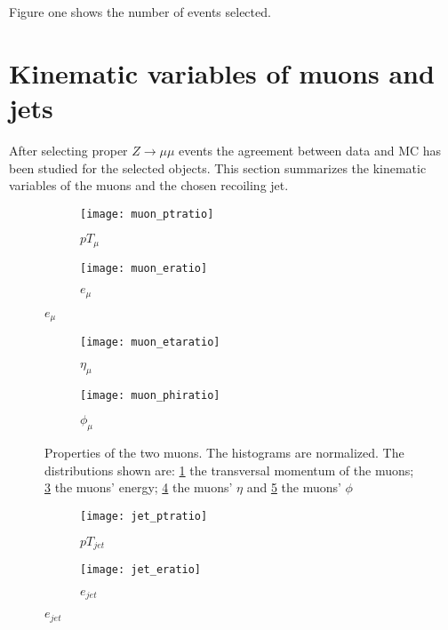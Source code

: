 Figure one shows the number of events selected. 

\section{Kinematic variables of muons and jets}

After selecting proper $Z \rightarrow \mu \mu$ events the agreement between data and MC has been studied for the selected objects. This section summarizes the kinematic variables of the muons and the chosen recoiling jet.

\begin{figure}[h]
\centering
\begin{subfigure}[b]{0.5\figwidth}
\texttt{[image: muon\_ptratio]}
\caption[Transversal momentum of the muons]{$pT_{\mu}$}
\label{fig:muonpt}
\end{subfigure}
\quad
\begin{subfigure}[b]{0.5\figwidth}
\texttt{[image: muon\_eratio]}
\caption[Energy of the muons]{$e_{\mu}$}
\label{fig:muone}
\end{subfigure}
\end{figure}


\begin{figure}[h]
\centering
\begin{subfigure}[b]{0.5\figwidth}
\texttt{[image: muon\_etaratio]}
\caption[$\eta$ of the muons]{$\eta_{\mu}$}
\label{fig:muoneta}
\end{subfigure}
\quad
\begin{subfigure}[b]{0.5\figwidth}
\texttt{[image: muon\_phiratio]}
\caption[$\phi$ of the muons]{$\phi_{\mu}$}
\label{fig:muonphi}
\end{subfigure}
\caption{Properties of the two muons. The histograms are normalized. The distributions shown are: \ref{fig:muonpt} the transversal momentum of the muons; \ref{fig:muone} the muons' energy; \ref{fig:muoneta} the muons' $\eta$ and \ref{fig:muonphi} the muons' $\phi$}
\label{fig:muons}
\end{figure}


\begin{figure}[h]
\centering
\begin{subfigure}[b]{0.5\figwidth}
\texttt{[image: jet\_ptratio]}
\caption[Transversal momentum of the recoiling jet]{$pT_{jet}$}
\label{fig:jetpt}
\end{subfigure}
\quad
\begin{subfigure}[b]{0.5\figwidth}
\texttt{[image: jet\_eratio]}
\caption[Energy of the recoiling jet]{$e_{jet}$}
\label{fig:jete}
\end{subfigure}
\end{figure}


